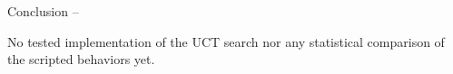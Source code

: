 \begin{bfseries} Conclusion -- \end{bfseries}
No tested implementation of the UCT search nor any statistical comparison of the scripted behaviors yet.

